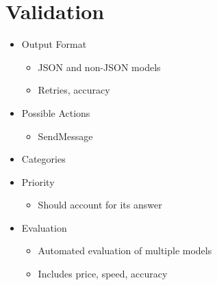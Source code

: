 \chapter{Validation}
\label{cha:validation}

\begin{itemize}
    \item Output Format
          \begin{itemize}
              \item JSON and non-JSON models
              \item Retries, accuracy
          \end{itemize}
    \item Possible Actions
          \begin{itemize}
              \item SendMessage
          \end{itemize}
    \item Categories
    \item Priority
          \begin{itemize}
              \item Should account for its answer
          \end{itemize}
    \item Evaluation
          \begin{itemize}
              \item Automated evaluation of multiple models
              \item Includes price, speed, accuracy
          \end{itemize}
\end{itemize}
